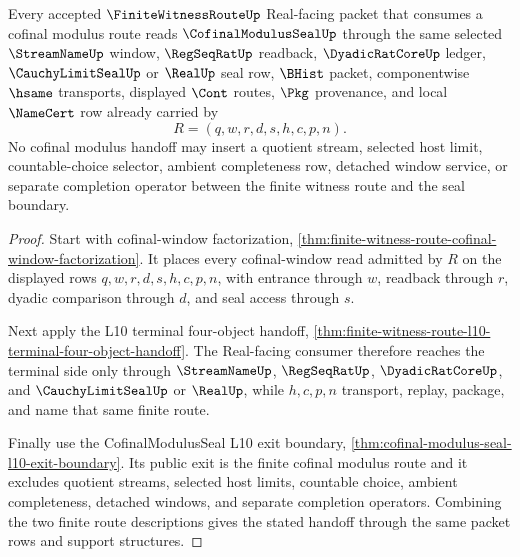 \begin{theorem}
\label{thm:finite-witness-route-cofinal-modulus-handoff}
Every accepted $\FiniteWitnessRouteUp$ Real-facing packet that consumes a cofinal modulus route reads $\CofinalModulusSealUp$ through the same selected $\StreamNameUp$ window, $\RegSeqRatUp$ readback, $\DyadicRatCoreUp$ ledger, $\CauchyLimitSealUp$ or $\RealUp$ seal row, $\BHist$ packet, componentwise $\hsame$ transports, displayed $\Cont$ routes, $\Pkg$ provenance, and local $\NameCert$ row already carried by
$$
R=(q,w,r,d,s,h,c,p,n).
$$
No cofinal modulus handoff may insert a quotient stream, selected host limit, countable-choice selector, ambient completeness row, detached window service, or separate completion operator between the finite witness route and the seal boundary.
\end{theorem}
\begin{proof}
Start with cofinal-window factorization, \autoref{thm:finite-witness-route-cofinal-window-factorization}. It places every cofinal-window read admitted by $R$ on the displayed rows $q,w,r,d,s,h,c,p,n$, with entrance through $w$, readback through $r$, dyadic comparison through $d$, and seal access through $s$.

Next apply the L10 terminal four-object handoff, \autoref{thm:finite-witness-route-l10-terminal-four-object-handoff}. The Real-facing consumer therefore reaches the terminal side only through $\StreamNameUp$, $\RegSeqRatUp$, $\DyadicRatCoreUp$, and $\CauchyLimitSealUp$ or $\RealUp$, while $h,c,p,n$ transport, replay, package, and name that same finite route.

Finally use the CofinalModulusSeal L10 exit boundary, \autoref{thm:cofinal-modulus-seal-l10-exit-boundary}. Its public exit is the finite cofinal modulus route and it excludes quotient streams, selected host limits, countable choice, ambient completeness, detached windows, and separate completion operators. Combining the two finite route descriptions gives the stated handoff through the same packet rows and support structures.
\end{proof}

